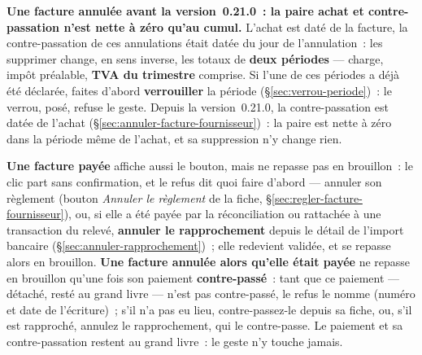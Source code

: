 \documentclass[a4paper,11pt,oneside]{article}
\begin{document}
\begin{keshwarning}
\textbf{Une facture annulée avant la version~0.21.0~: la paire achat et contre-passation n'est
nette à zéro qu'au cumul.} L'achat est daté de la facture, la contre-passation de ces annulations
était datée du jour de l'annulation~: les supprimer change, en sens inverse, les totaux de \textbf{deux
périodes} --- charge, impôt préalable, \textbf{TVA du trimestre} comprise. Si l'une de ces
périodes a déjà été déclarée, faites d'abord \textbf{verrouiller} la période
(\S\ref{sec:verrou-periode})~: le verrou, posé, refuse le geste. Depuis la version~0.21.0, la
contre-passation est datée de l'achat (\S\ref{sec:annuler-facture-fournisseur})~: la paire est
nette à zéro dans la période même de l'achat, et sa suppression n'y change rien.
\end{keshwarning}

\textbf{Une facture payée} affiche aussi le bouton, mais ne repasse pas en brouillon~: le clic
part sans confirmation, et le refus dit quoi faire d'abord --- annuler son règlement (bouton
\emph{Annuler le règlement} de la fiche, \S\ref{sec:regler-facture-fournisseur}), ou, si elle a
été payée par la réconciliation ou rattachée à une transaction du relevé, \textbf{annuler le
rapprochement} depuis le détail de l'import bancaire (\S\ref{sec:annuler-rapprochement})~; elle
redevient validée, et se repasse alors en brouillon. \textbf{Une facture annulée alors qu'elle
était payée} ne repasse en brouillon qu'une fois son paiement \textbf{contre-passé}~: tant que ce
paiement --- détaché, resté au grand livre --- n'est pas contre-passé, le refus le nomme (numéro
et date de l'écriture)~; s'il n'a pas eu lieu, contre-passez-le depuis sa fiche, ou, s'il est
rapproché, annulez le rapprochement, qui le contre-passe. Le paiement et sa contre-passation
restent au grand livre~: le geste n'y touche jamais.
\end{document}

